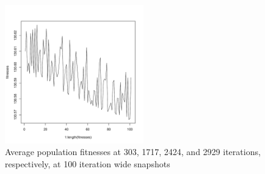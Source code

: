 \documentclass[12pt]{article}
\begin{document}
\begin{figure}[!h]
\begin{center}
		\includegraphics[width=60mm]{images/rastrigin.ss/avg_2929.pdf}
               	\caption{Average population fitnesses at 303, 1717, 2424, and 2929 iterations, respectively, at 100 iteration wide snapshots}
                \label{rastrigin_ss_avg_pop_fit}
        \end{center}
\end{figure}


\pagebreak
\end{document}
